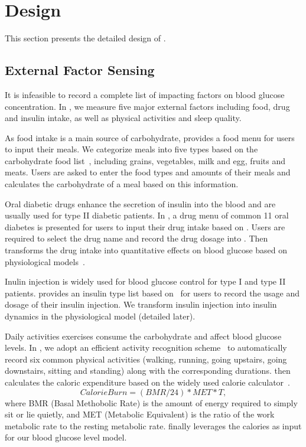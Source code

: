 
\section{Design}
\label{sec:design}
This section presents the detailed design of \sysname.

\subsection{External Factor Sensing}
\label{subsec:external}
It is infeasible to record a complete list of impacting factors on blood glucose concentration.
In \sysname, we measure five major external factors including food, drug and insulin intake, as well as physical activities and sleep quality.

As food intake is a main source of carbohydrate, \sysname provides a food menu for users to input their meals.
We categorize meals into five types based on the carbohydrate food list~\cite{bib:carblist}, including grains, vegetables, milk and egg, fruits and meats.
Users are asked to enter the food types and amounts of their meals and \sysname calculates the carbohydrate of a meal based on this information.

Oral diabetic drugs enhance the secretion of insulin into the blood and are usually used for type II diabetic patients.
In \sysname, a drug menu of common 11 oral diabetes is presented for users to input their drug intake based on \cite{bib:druglist}.
Users are required to select the drug name and record the drug dosage into \sysname.
Then \sysname transforms the drug intake into quantitative effects on blood glucose based on physiological models~\cite{bib:AIM07:Bolen}.

Inulin injection is widely used for blood glucose control for type I and type II patients. 
\sysname provides an insulin type list based on~\cite{bib:insulinlist} for users to record the usage and dosage of their insulin injection.
We transform insulin injection into insulin dynamics in the physiological model (detailed later).
 

Daily activities \eg exercises consume the carbohydrate and affect blood glucose levels.
In \sysname, we adopt an efficient activity recognition scheme~\cite{bib:KDDEN11:Kwapisz} to automatically record six common physical activities (walking, running, going upstairs, going downstairs, sitting and standing) along with the corresponding durations.
\sysname then calculates the caloric expenditure based on the widely used calorie calculator~\cite{bib:HealthStatus, bib:CalorieCounter}.
\begin{equation}\label{eq:calorie_burn}
  Calorie Burn = (BMR/24)*MET*T,
\end{equation}
where BMR (Basal Methobolic Rate) is the amount of energy required to simply sit or lie quietly, and MET (Metabolic Equivalent) is the ratio of the work metabolic rate to the resting metabolic rate.
\sysname finally leverages the calories as input for our blood glucose level model.

